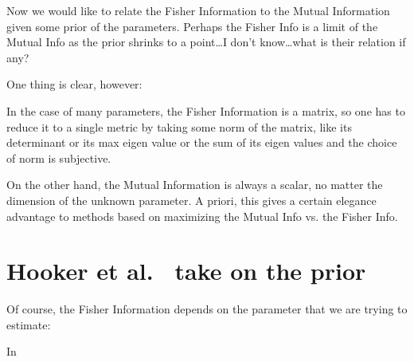 \documentclass{article}
\begin{document}
Now we would like to relate the Fisher Information to the Mutual Information
given some prior of the parameters. Perhaps the Fisher Info is a limit of the
Mutual Info as the prior shrinks to a point\ldots I don't know\ldots what is
their relation if any?

One thing is clear, however:

In the case of many parameters, the Fisher Information is a matrix, so one has
to reduce it to a single metric by taking some norm of the
matrix, like its determinant or its max eigen value or the sum of its eigen
values and the choice of norm is subjective.

On the other hand, the Mutual Information is always a scalar, no matter the
dimension of the unknown parameter. A priori, this gives a certain
elegance advantage to methods based on maximizing the Mutual Info vs. the Fisher
Info. 



\section{Hooker et al.\ \cite{Lin} take on the prior}
Of course, the Fisher Information depends on the parameter that we are trying to
estimate:

In


 

\end{document}
